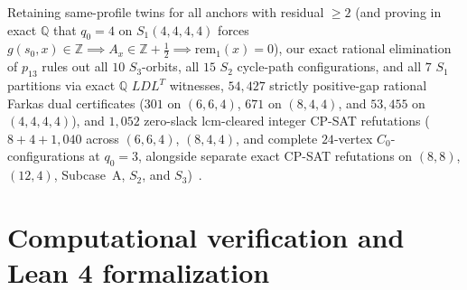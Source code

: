 \documentclass[11pt,reqno]{amsart}
\theoremstyle{definition}
\theoremstyle{remark}
\begin{document}
Retaining same-profile twins for all anchors with residual $\ge 2$ (and proving in exact $\mathbb{Q}$ that $q_0 = 4$ on $S_1(4,4,4,4)$ forces $g(s_0, x) \in \mathbb{Z} \implies A_x \in \mathbb{Z} + \frac{1}{2} \implies \mathrm{rem}_1(x) = 0$), our exact rational elimination of $p_{13}$ rules out all $10$ $S_3$-orbits, all $15$ $S_2$ cycle-path configurations, and all $7$ $S_1$ partitions via exact $\mathbb{Q}$ $LDL^T$ witnesses, $54{,}427$ strictly positive-gap rational Farkas dual certificates ($301$ on $(6,6,4)$, $671$ on $(8,4,4)$, and $53{,}455$ on $(4,4,4,4)$), and $1{,}052$ zero-slack $\mathrm{lcm}$-cleared integer CP-SAT refutations ($8 + 4 + 1{,}040$ across $(6,6,4)$, $(8,4,4)$, and complete $24$-vertex $C_0$-configurations at $q_0 = 3$, alongside separate exact CP-SAT refutations on $(8,8)$, $(12,4)$, Subcase~A, $S_2$, and $S_3$)~\cite{CompanionFull}.

\section{Computational verification and Lean 4 formalization}\label{sec:verification}
\end{document}
